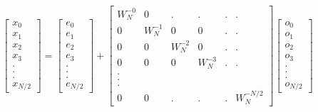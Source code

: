\documentclass[journal,12pt,twocolumn]{IEEEtran}
\begin{document}
\begin{equation}
\begin{bmatrix}
x_{0} \\
x_{1} \\
x_{2} \\
x_{3} \\
. \\
. \\
. \\
x_{N/2}
\end{bmatrix}
= 
\begin{bmatrix}
e_{0} \\
e_{1} \\
e_{2} \\
e_{3} \\
. \\
. \\
. \\
e_{N/2}
\end{bmatrix}
+
\begin{bmatrix}
W^{-0}_{N} & 0  &. &. &.&. \\
0 & W^{-1}_{N} & 0 & 0 &. &. \\
0 & 0 & W^{-2}_{N} & 0 &. &. \\
0 & 0 & 0 & W^{-3}_{N} &. &.\\
.\\
.\\
.\\
0 & 0 &. &.&. &W^{-N/2}_{N}
\end{bmatrix}
\begin{bmatrix}
o_{0} \\
o_{1} \\
o_{2} \\
o_{3} \\
. \\
. \\
. \\
o_{N/2}
\end{bmatrix}
\end{equation}
\end{document}
